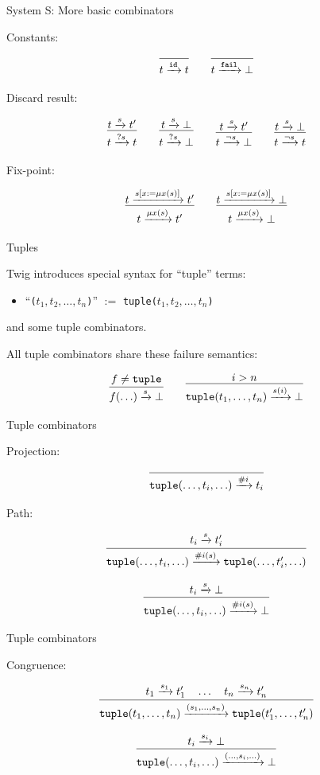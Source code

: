 \documentclass{beamer}
\newcommand{\arr}[1]{\ensuremath\xrightarrow{#1}}
\begin{document}
\begin{frame}{System S: More basic combinators}

Constants:

\[
\infer{t \arr{\mathtt{id}} t}{}
\qquad
\infer{t \arr{\mathtt{fail}} \bot}{}
\]

Discard result:

\[
\infer{t \arr{?s} t}{t \arr{s} t'}
\qquad 
\infer{t \arr{?s} \bot}{t \arr{s} \bot}
\qquad
\infer{t \arr{\lnot s} \bot}{t \arr{s} t'}
\qquad 
\infer{t \arr{\lnot s} t}{t \arr{s} \bot}
\]

Fix-point:

\[
\infer{t \arr{\mu x(s)} t'}{t \arr{s[x := \mu x(s)]} t'}
\qquad 
\infer{t \arr{\mu x(s)} \bot}{t \arr{s[x := \mu x(s)]} \bot}
\]

\end{frame}


\begin{frame}{Tuples}

Twig introduces special syntax for ``tuple'' terms:

\begin{itemize}
  \item ``\texttt{(}$t_1,t_2,\ldots,t_n$\texttt{)}'' 
        $:=$ \texttt{tuple(}$t_1,t_2,\ldots,t_n$\texttt{)}
\end{itemize}

and some tuple combinators.

All tuple combinators share these failure semantics:

\[
\infer{f(\ldots) \arr{s} \bot}
{f \neq \mathtt{tuple}}
\qquad
\infer{\mathtt{tuple}(t_1,\ldots,t_n) \arr{s(i)} \bot}{i > n}
\]

\end{frame}

\begin{frame}{Tuple combinators}

Projection:

\[
\infer{\mathtt{tuple}(\ldots,t_i,\ldots) \arr{\#i} t_i}{}
\]

Path:

\[
\infer{\mathtt{tuple}(\ldots,t_i,\ldots) \arr{\#i(s)} 
\mathtt{tuple}(\ldots,t_i',\ldots)}
{t_i \arr{s} t_i'}
\]

\[
\infer{\mathtt{tuple}(\ldots,t_i,\ldots) \arr{\#i(s)} \bot}
{t_i \arr{s} \bot}
\]

\end{frame}


\begin{frame}{Tuple combinators}

Congruence:

\[
\infer{
\mathtt{tuple}(t_1,\ldots,t_n)
\arr{(s_1,\ldots,s_n)}
\mathtt{tuple}(t_1',\ldots,t_n') }
{t_1 \arr{s_1} t_1' \quad \ldots \quad t_n \arr{s_n} t_n'}
\]

\[
\infer{
\mathtt{tuple}(\ldots,t_i,\ldots)
\arr{(\ldots,s_i,\ldots)}
\bot}
{t_i \arr{s_i} \bot}
\]

\end{frame}
\end{document}
